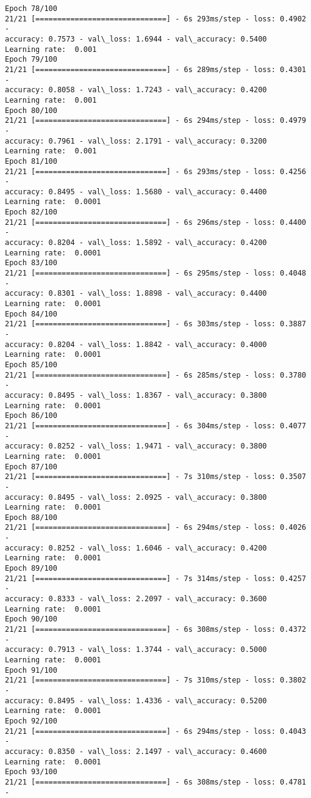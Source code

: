 \documentclass[11pt]{article}
\begin{document}
\begin{Verbatim}[commandchars=\\\{\}]
Epoch 78/100
21/21 [==============================] - 6s 293ms/step - loss: 0.4902 -
accuracy: 0.7573 - val\_loss: 1.6944 - val\_accuracy: 0.5400
Learning rate:  0.001
Epoch 79/100
21/21 [==============================] - 6s 289ms/step - loss: 0.4301 -
accuracy: 0.8058 - val\_loss: 1.7243 - val\_accuracy: 0.4200
Learning rate:  0.001
Epoch 80/100
21/21 [==============================] - 6s 294ms/step - loss: 0.4979 -
accuracy: 0.7961 - val\_loss: 2.1791 - val\_accuracy: 0.3200
Learning rate:  0.001
Epoch 81/100
21/21 [==============================] - 6s 293ms/step - loss: 0.4256 -
accuracy: 0.8495 - val\_loss: 1.5680 - val\_accuracy: 0.4400
Learning rate:  0.0001
Epoch 82/100
21/21 [==============================] - 6s 296ms/step - loss: 0.4400 -
accuracy: 0.8204 - val\_loss: 1.5892 - val\_accuracy: 0.4200
Learning rate:  0.0001
Epoch 83/100
21/21 [==============================] - 6s 295ms/step - loss: 0.4048 -
accuracy: 0.8301 - val\_loss: 1.8898 - val\_accuracy: 0.4400
Learning rate:  0.0001
Epoch 84/100
21/21 [==============================] - 6s 303ms/step - loss: 0.3887 -
accuracy: 0.8204 - val\_loss: 1.8842 - val\_accuracy: 0.4000
Learning rate:  0.0001
Epoch 85/100
21/21 [==============================] - 6s 285ms/step - loss: 0.3780 -
accuracy: 0.8495 - val\_loss: 1.8367 - val\_accuracy: 0.3800
Learning rate:  0.0001
Epoch 86/100
21/21 [==============================] - 6s 304ms/step - loss: 0.4077 -
accuracy: 0.8252 - val\_loss: 1.9471 - val\_accuracy: 0.3800
Learning rate:  0.0001
Epoch 87/100
21/21 [==============================] - 7s 310ms/step - loss: 0.3507 -
accuracy: 0.8495 - val\_loss: 2.0925 - val\_accuracy: 0.3800
Learning rate:  0.0001
Epoch 88/100
21/21 [==============================] - 6s 294ms/step - loss: 0.4026 -
accuracy: 0.8252 - val\_loss: 1.6046 - val\_accuracy: 0.4200
Learning rate:  0.0001
Epoch 89/100
21/21 [==============================] - 7s 314ms/step - loss: 0.4257 -
accuracy: 0.8333 - val\_loss: 2.2097 - val\_accuracy: 0.3600
Learning rate:  0.0001
Epoch 90/100
21/21 [==============================] - 6s 308ms/step - loss: 0.4372 -
accuracy: 0.7913 - val\_loss: 1.3744 - val\_accuracy: 0.5000
Learning rate:  0.0001
Epoch 91/100
21/21 [==============================] - 7s 310ms/step - loss: 0.3802 -
accuracy: 0.8495 - val\_loss: 1.4336 - val\_accuracy: 0.5200
Learning rate:  0.0001
Epoch 92/100
21/21 [==============================] - 6s 294ms/step - loss: 0.4043 -
accuracy: 0.8350 - val\_loss: 2.1497 - val\_accuracy: 0.4600
Learning rate:  0.0001
Epoch 93/100
21/21 [==============================] - 6s 308ms/step - loss: 0.4781 -

\end{Verbatim}
\end{document}

